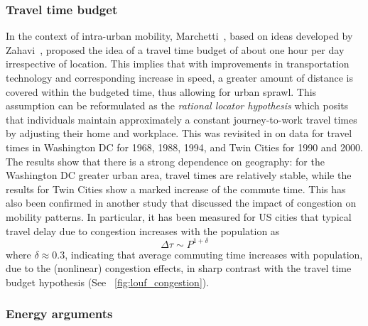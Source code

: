 \subsubsection{Travel time budget}
In the context of intra-urban mobility, Marchetti~\cite{Marchetti_1994}, based on ideas developed by Zahavi~\cite{Zahavi_1977}, proposed the idea of a travel time budget of about one hour per day irrespective of location. This implies that with improvements in transportation technology and corresponding increase in speed, a greater amount of distance is covered within the budgeted time, thus allowing for urban sprawl. This assumption can be reformulated as the \emph{rational locator hypothesis} \cite{levinson_2005_rational} which posits that individuals maintain approximately a constant journey-to-work travel times by adjusting their home and workplace. This was revisited in \cite{levinson_2005_rational} on data for travel times in Washington DC for 1968, 1988, 1994, and Twin Cities for 1990 and 2000. The results show that there is a strong dependence on geography: for the Washington DC greater urban area, travel times are relatively stable, while the results for Twin Cities show a marked increase of the commute time.
This has also been confirmed in another study \cite{louf_2014_how} that discussed the impact of congestion on mobility patterns. In particular, it has been measured for US cities that typical travel delay due to congestion increases with the population as 
\begin{equation}
\Delta\tau\sim P^{1+\delta}
\end{equation}
where $\delta\approx 0.3$, indicating that average commuting time increases with population, due to the (nonlinear) congestion effects, in sharp contrast with the travel time budget hypothesis (See \figurename~\ref{fig:louf_congestion}). 



%


\subsubsection{Energy arguments}


